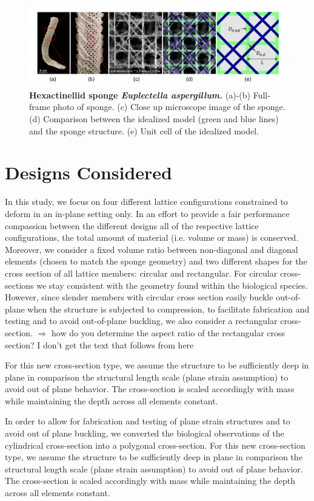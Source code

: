 \documentclass[10pt,twoside]{fernandes_supp}
\newcommand{\KB}[1]{\noindent\color{blue}$\Longrightarrow$ #1\normalcolor}
\begin{document}
\begin{figure}[H]
    \centering
    \includegraphics[width=0.9\linewidth]{SFig1.png}
    \caption{\textbf{Hexactinellid sponge \textit{Euplectella aspergillum.}} (a)-(b) Full-frame photo of sponge.  (c)  Close up microscope image of the sponge. (d) Comparison between the idealized model (green and blue lines) and the sponge structure. (e) Unit cell of the idealized model.}
    \label{Sponge}
\end{figure}

\section{Designs Considered}
In this study, we focus on four different lattice configurations constrained to deform in an in-plane setting only. In an effort to provide a fair performance compassion between the different designs all of the respective lattice configurations, the total amount of material (i.e. volume or mass) is conserved. Moreover,  we consider a fixed volume ratio between non-diagonal and diagonal elements (chosen to match the sponge geometry) and two different shapes for the cross section of all lattice members: circular and rectangular.  For circular cross-sections  we stay consistent with the geometry found within the biological species. However, since slender members with circular cross section easily buckle out-of-plane when the structure is subjected to compression, to facilitate  fabrication and testing and to avoid out-of-plane buckling, we also consider a rectangular cross-section. \KB{how do you determine the aspect ratio of the rectangular cross section? I don't get the text that follows from here}

For this new cross-section type, we assume the structure to be sufficiently deep in plane in comparison the structural length scale (plane strain assumption) to avoid out of plane behavior. The cross-section is scaled accordingly with mass while maintaining the depth across all elements constant. 

In order to allow for fabrication and testing of plane strain structures and to avoid out of plane buckling, we converted the biological observations of the cylindrical cross-section into a polygonal cross-section. For this new cross-section type, we assume the structure to be sufficiently deep in plane in comparison the structural length scale (plane strain assumption) to avoid out of plane behavior. The cross-section is scaled accordingly with mass while maintaining the depth across all elements constant. 
\end{document}
